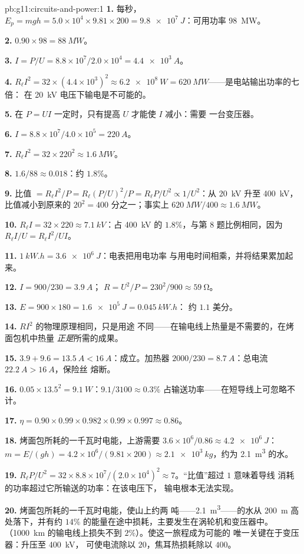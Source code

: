 \begin{solution}{pb:g11:circuits-and-power:1}
\textbf{1.} 每秒，$E_p = mgh = 5.0\times10^{4} \times 9.81 \times
200 = \qty{9.8e7}{J}$：可用功率 \qty{98}{MW}。

\textbf{2.} $0.90 \times 98 = \qty{88}{MW}$。

\textbf{3.} $I = P/U = 8.8\times10^{7}/2.0\times10^{4} = \qty{4.4e3}{A}$。

\textbf{4.} $R_\ell I^2 = 32 \times (4.4\times10^{3})^2 \approx
\qty{6.2e8}{W} = \qty{620}{MW}$——是电站输出功率的七倍：
在 \qty{20}{kV} 电压下输电是不可能的。

\textbf{5.} 在 $P = UI$ 一定时，只有提高 $U$ 才能使 $I$ 减小：需要
一台变压器。

\textbf{6.} $I = 8.8\times10^{7}/4.0\times10^{5} = \qty{220}{A}$。

\textbf{7.} $R_\ell I^2 = 32 \times 220^2 \approx \qty{1.6}{MW}$。

\textbf{8.} $1.6/88 \approx 0.018$：约 $1.8\%$。

\textbf{9.} 比值 $= R_\ell I^2/P = R_\ell (P/U)^2/P = R_\ell P/U^2
\propto 1/U^2$：从 \qty{20}{kV} 升至 \qty{400}{kV}，比值减小到原来的
$20^2 = 400$ 分之一；事实上 $\qty{620}{MW}/400 \approx \qty{1.6}{MW}$。

\textbf{10.} $R_\ell I = 32 \times 220 \approx \qty{7.1}{kV}$：占
\qty{400}{kV} 的 $1.8\%$，与第 8 题比例相同，因为
$R_\ell I/U = R_\ell I^2/UI$。

\textbf{11.} $\qty{1}{kW.h} = \qty{3.6e6}{J}$：电表把用电功率
与用电时间相乘，并将结果累加起来。

\textbf{12.} $I = 900/230 = \qty{3.9}{A}$；
$R = U^2/P = 230^2/900 \approx \qty{59}{\ohm}$。

\textbf{13.} $E = 900 \times 180 = \qty{1.6e5}{J} = \qty{0.045}{kW.h}$：
约 $1.1$ 美分。

\textbf{14.} $RI^2$ 的物理原理相同，只是用途
不同——在输电线上热量是不需要的，在烤面包机中热量
\emph{正是}所需的成果。

\textbf{15.} $3.9 + 9.6 = \qty{13.5}{A} < \qty{16}{A}$：成立。加热器
$2000/230 = \qty{8.7}{A}$：总电流 $\qty{22.2}{A} > \qty{16}{A}$，保险丝
熔断。

\textbf{16.} $0.05 \times 13.5^2 = \qty{9.1}{W}$：$9.1/3100 \approx
0.3\%$ 占输送功率——在短导线上可忽略不计。

\textbf{17.} $\eta = 0.90 \times 0.99 \times 0.982 \times 0.99 \times
0.997 \approx 0.86$。

\textbf{18.} 烤面包所耗的一千瓦时电能，上游需要 $3.6\times10^{6}/0.86
\approx \qty{4.2e6}{J}$：$m = E/(gh) = 4.2\times10^{6}/(9.81
\times 200) \approx \qty{2.1e3}{kg}$，约为 \qty{2.1}{m^3} 的水。

\textbf{19.} $R_\ell P/U^2 = 32 \times 8.8\times10^{7}/(2.0\times
10^{4})^2 \approx 7$。“比值”超过 $1$ 意味着导线
消耗的功率超过它所输送的功率：在该电压下，
输电根本无法实现。

\textbf{20.} 烤面包所耗的一千瓦时电能，使山上约两
吨——\qty{2.1}{m^3}——的水从 \qty{200}{m} 高处落下，并有约
$14\%$ 的能量在途中损耗，主要发生在涡轮机和变压器中。
（\qty{1000}{km} 的输电线上损失不到 $2\%$）。使这一旅程成为可能的
唯一关键在于变压器：升压至 \qty{400}{kV}，
可使电流除以 $20$，焦耳热损耗除以 $400$。
\end{solution}
